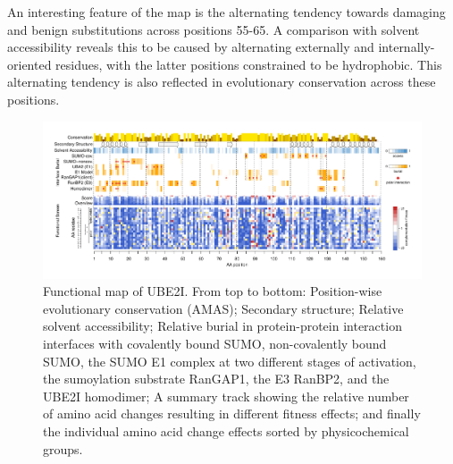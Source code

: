 An interesting feature of the map is the alternating tendency towards damaging and benign substitutions across positions 55-65. A comparison with solvent accessibility reveals this to be caused by alternating externally and internally-oriented residues, with the latter positions constrained to be hydrophobic. This alternating tendency is also reflected in evolutionary conservation across these positions. 

\begin{landscape}
\begin{figure}[h]
	\centering
	\includegraphics[width=9in]{img/ube2i_map.pdf}
	\caption{Functional map of UBE2I. From top to bottom: Position-wise evolutionary conservation (AMAS); Secondary structure; Relative solvent accessibility; Relative burial in protein-protein interaction interfaces with covalently bound SUMO, non-covalently bound SUMO, the SUMO E1 complex at two different stages of activation, the sumoylation substrate RanGAP1, the E3 RanBP2, and the UBE2I homodimer; A summary track showing the relative number of amino acid changes resulting in different fitness effects; and finally the individual amino acid change effects sorted by physicochemical groups.}
	\label{fig:ube2i-map}
\end{figure}
\end{landscape}


